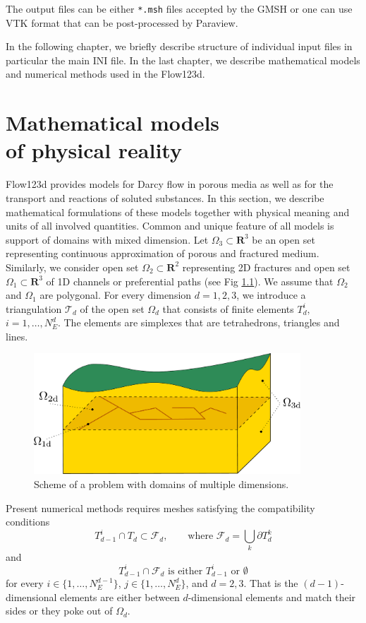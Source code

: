 \documentclass[12pt,a4paper]{report}
\def\Real{{\mathbf R}}
\begin{document}
The output files can be either \verb'*.msh' files accepted by the GMSH or one can use VTK format that can be post-processed by Paraview.

In the following chapter, we briefly describe structure of individual input files in particular the main INI file. In the last chapter, we describe
mathematical models and numerical methods used in the Flow123d.


\chapter{Mathematical models \\of physical reality}
\label{PhysicalModels}

Flow123d provides models for Darcy flow in porous media as well as for the transport and reactions of soluted substances. In this section, we describe 
mathematical formulations of these models together with physical meaning and units of all involved quantities. Common and unique feature of all models is support of
domains with mixed dimension. Let $\Omega_{3} \subset \Real^3$ be an open set representing continuous approximation of porous and fractured medium.
Similarly, we consider open set $\Omega_2\subset \Real^2$ representing 2D fractures and open set $\Omega_1\subset \Real^3$ of 1D channels or preferential paths 
(see Fig \ref{fig:multi-dim}).
We assume that $\Omega_2$ and $\Omega_1$ are polygonal. For every dimension $d=1,2,3$, we introduce a triangulation $\mathcal{T}_{d}$ of the open set $\Omega_d$
that consists of finite elements $T_{d}^{i},$\ $i = 1,\dots,N_{E}^{d}$. The elements are simplexes that are tetrahedrons, triangles and lines.

\begin{figure}[h]
\centering
\includegraphics[width=10cm]{ground_fractures}
\caption{
    \label{fig:multi-dim}
    Scheme of a problem with domains of multiple dimensions.
}
\end{figure}

Present numerical methods requires meshes satisfying the compatibility conditions
\begin{equation}
        T_{d-1}^i \cap T_d \subset \mathcal{F}_d,   \qquad \text{where } \mathcal{F}_d = \bigcup_{k} \partial T_{d}^{k}
\end{equation}
and
\begin{equation}
        T_{d-1}^i \cap \mathcal{F}_d    \text{ is either $T_{d-1}^i$ or $\emptyset$}    
\end{equation}
for every $i\in\{1,\dots, N_{E}^{d-1}\}$, $j\in\{1,\dots,N_{E}^{d}\}$,  and $d=2,3$. That is the $(d-1)$-dimensional elements are either between $d$-dimensional elements and
match their sides or they poke out of $\Omega_d$. 
\end{document}

